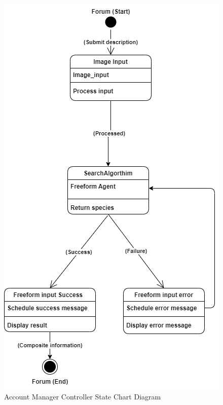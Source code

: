 \documentclass[]{article}
\numberwithin{figure}{section}
\begin{document}
\begin{figure}[h]
    \centering
    \includegraphics[scale=0.8]{FreeForm_Agent.png}
    \caption{Account Manager Controller State Chart Diagram}
    \label{fig:account_manager_controller}
\end{figure}
\clearpage 
\end{document}
